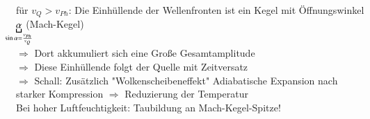 für $ v_Q>v_{Ph} $: Die Einhüllende der Wellenfronten ist ein Kegel mit Öffnungswinkel $ \underbracket{\alpha}_{\mathclap{\sin\alpha=\frac{v_{Ph}}{v_Q}}} $ (Mach-Kegel)\\
$ \Rightarrow $ Dort akkumuliert sich eine Große Gesamtamplitude \\
$ \Rightarrow $ Diese Einhüllende folgt der Quelle mit Zeitversatz\\
\enter
$ \Rightarrow $ Schall:
\bild
Zusätzlich "Wolkenscheibeneffekt"
Adiabatische Expansion nach starker Kompression $ \Rightarrow $ Reduzierung der Temperatur\\
Bei hoher Luftfeuchtigkeit: Taubildung an Mach-Kegel-Spitze!
\bild